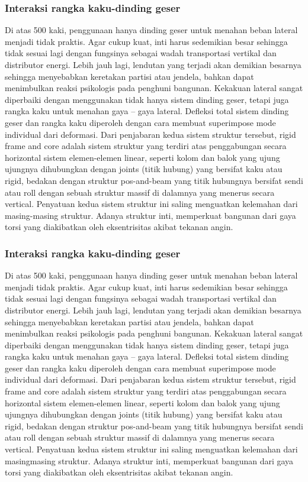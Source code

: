 \documentclass[../modul_skb.tex]{subfiles}
\begin{document}
\subsubsection{Interaksi rangka kaku-dinding geser}%

Di atas 500 kaki, penggunaan hanya dinding geser untuk menahan beban lateral menjadi tidak praktis. Agar cukup kuat, inti harus sedemikian besar sehingga tidak sesuai lagi dengan fungsinya sebagai wadah transportasi vertikal dan distributor energi. Lebih jauh lagi, lendutan yang terjadi akan demikian besarnya sehingga menyebabkan keretakan partisi atau jendela, bahkan dapat menimbulkan reaksi psikologis pada penghuni bangunan. Kekakuan lateral sangat diperbaiki dengan menggunakan tidak hanya sistem dinding geser, tetapi juga rangka kaku untuk menahan gaya – gaya lateral. Defleksi total sistem dinding geser dan rangka kaku diperoleh dengan cara membuat superimpose mode individual dari deformasi. Dari penjabaran kedua sistem struktur tersebut, rigid frame and core adalah sistem struktur yang terdiri atas penggabungan secara horizontal sistem elemen-elemen linear, seperti kolom dan balok yang ujung ujungnya dihubungkan dengan joints (titik hubung) yang bersifat kaku atau rigid, bedakan dengan struktur pos-and-beam yang titik hubungnya bersifat sendi atau roll dengan sebuah struktur massif di dalamnya yang menerus secara vertical. Penyatuan kedua sistem struktur ini saling menguatkan kelemahan dari masing-masing struktur. Adanya struktur inti, memperkuat bangunan dari gaya torsi yang diakibatkan oleh eksentrisitas akibat tekanan angin.

\subsubsection{Interaksi rangka kaku-dinding geser}%

Di atas 500 kaki, penggunaan hanya dinding geser untuk menahan beban lateral menjadi tidak praktis. Agar cukup kuat, inti harus sedemikian besar sehingga tidak sesuai lagi dengan fungsinya sebagai wadah transportasi vertikal dan distributor energi. Lebih jauh lagi, lendutan yang terjadi akan demikian besarnya sehingga menyebabkan keretakan partisi atau jendela, bahkan dapat menimbulkan reaksi psikologis pada penghuni bangunan. Kekakuan lateral sangat diperbaiki dengan menggunakan tidak hanya sistem dinding geser, tetapi juga rangka kaku untuk menahan gaya – gaya lateral. Defleksi total sistem dinding geser dan rangka kaku diperoleh dengan cara membuat superimpose mode individual dari deformasi. Dari penjabaran kedua sistem struktur tersebut, rigid frame and core adalah sistem struktur yang terdiri atas penggabungan secara horizontal sistem elemen-elemen linear, seperti kolom dan balok yang ujung ujungnya dihubungkan dengan joints (titik hubung) yang bersifat kaku atau rigid, bedakan dengan struktur pos-and-beam yang titik hubungnya bersifat sendi atau roll dengan sebuah struktur massif di dalamnya yang menerus secara vertical. Penyatuan kedua sistem struktur ini saling menguatkan kelemahan dari masingmasing struktur. Adanya struktur inti, memperkuat bangunan dari gaya torsi yang diakibatkan oleh eksentrisitas akibat tekanan angin.
\end{document}
